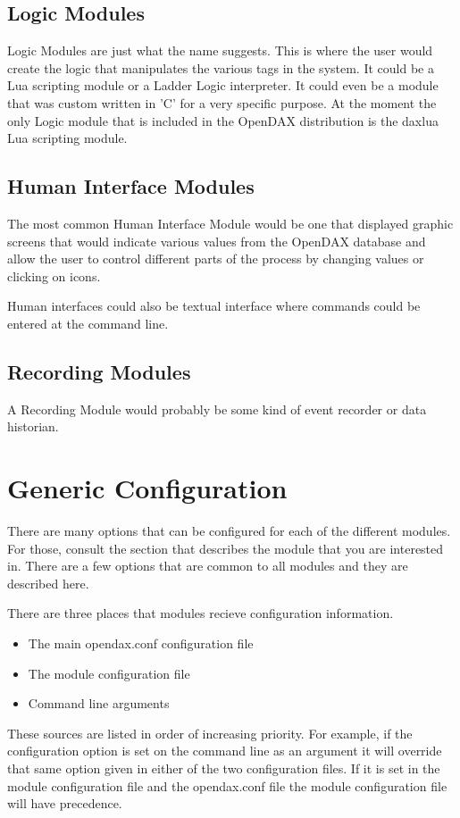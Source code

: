 \documentclass[letterpaper,10pt]{report}
\begin{document}
\subsection*{Logic Modules}
Logic Modules are just what the name suggests.  This is where the user would create the logic that manipulates the various tags in the system.  It could be a Lua scripting module or a Ladder Logic interpreter.  It could even be a module that was custom written in 'C' for a very specific purpose.  At the moment the only Logic module that is included in the OpenDAX distribution is the daxlua Lua scripting module.

\subsection*{Human Interface Modules}
The most common Human Interface Module would be one that displayed graphic screens that would indicate various values from the OpenDAX database and allow the user to control different parts of the process by changing values or clicking on icons.

Human interfaces could also be textual interface where commands could be entered at the command line.

\subsection*{Recording Modules}
A Recording Module would probably be some kind of event recorder or data historian.

\section*{Generic Configuration}
There are many options that can be configured for each of the different modules.  For those, consult the section that describes the module that you are interested in.  There are a few options that are common to all modules and they are described here.

There are three places that modules recieve configuration information.

\begin{itemize}
\item The main opendax.conf configuration file
\item The module configuration file
\item Command line arguments
\end{itemize}

These sources are listed in order of increasing priority.  For example, if the configuration option is set on the command line as an argument it will override that same option given in either of the two configuration files.  If it is set in the module configuration file and the opendax.conf file the module configuration file will have precedence.
\end{document}

